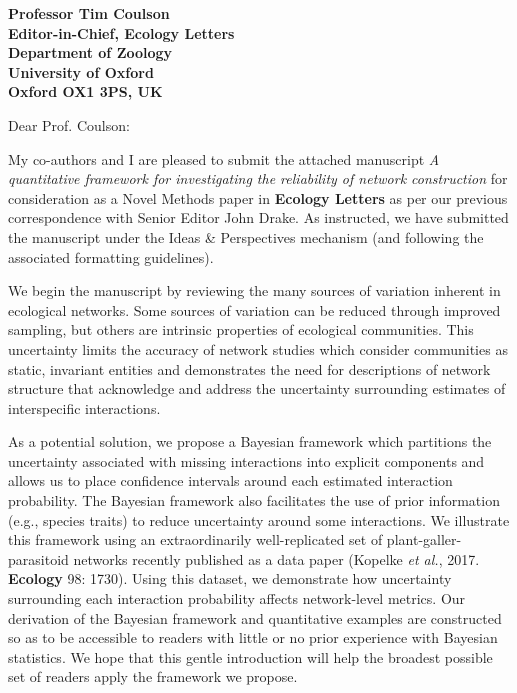 \documentclass[12pt]{letter}
\begin{document}
\begin{letter}{\bf Professor Tim Coulson\\
               Editor-in-Chief, Ecology Letters\\
               Department of Zoology\\
               University of Oxford\\
               Oxford OX1 3PS, UK
                               }


\opening{Dear Prof. Coulson:}

    My co-authors and I are pleased to submit the attached manuscript \emph{A quantitative framework for investigating the reliability of network construction} for consideration as a Novel Methods paper in \textbf{Ecology Letters} as per our previous correspondence with Senior Editor John Drake. As instructed, we have submitted the manuscript under the Ideas \& Perspectives mechanism (and following the associated formatting guidelines).


    We begin the manuscript by reviewing the many sources of variation inherent in ecological networks. Some sources of variation can be reduced through improved sampling, but others are intrinsic properties of ecological communities. This uncertainty limits the accuracy of network studies which consider communities as static, invariant entities and demonstrates the need for descriptions of network structure that acknowledge and address the uncertainty surrounding estimates of interspecific interactions.


    As a potential solution, we propose a Bayesian framework which partitions the uncertainty associated with missing interactions into explicit components and allows us to place confidence intervals around each estimated interaction probability. The Bayesian framework also facilitates the use of prior information (e.g., species traits) to reduce uncertainty around some interactions. We illustrate this framework using an extraordinarily  well-replicated set of plant-galler-parasitoid networks recently published as a data paper (Kopelke \emph{et al.}, 2017. \textbf{Ecology} 98: 1730). Using this dataset, we demonstrate how uncertainty surrounding each interaction probability affects network-level metrics. Our derivation of the Bayesian framework and quantitative examples are constructed so as to be accessible to readers with little or no prior experience with Bayesian statistics. We hope that this gentle introduction will help the broadest possible set of readers apply the framework we propose.



\end{letter}
\end{document}
